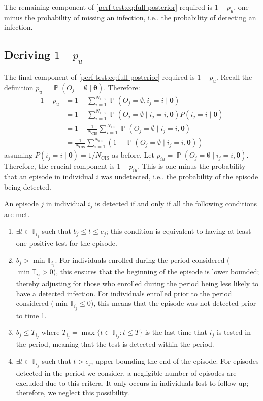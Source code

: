 \documentclass[12pt]{article}
\makeatletter
\DeclareMathOperator{\prob}{\mathbb{P}}
\renewcommand{\vec}[1]{\bm{#1}}
\newcommand{\ssep}{:}
\newcommand{\Ncis}{N_\text{CIS}}
\newcommand{\sched}{\mathbb{T}}
\DeclareRobustCommand\onedot{\futurelet\@let@token\@onedot}
\def\@onedot{\ifx\@let@token.\else.\null\fi\xspace}
\def\ie{i.e\onedot} \def\Ie{{I.e}\onedot}
\makeatother
\begin{document}
The remaining component of \cref{perf-test:eq:full-posterior} required is $1- p_u$, one minus the probability of missing an infection, \ie the probability of detecting an infection.

\subsection{Deriving $1 - p_u$} \label{sec:prob-undetected}

The final component of \cref{perf-test:eq:full-posterior} required is $1 - p_u$.
Recall the definition $p_u = \prob(O_j = \emptyset \mid \vec{\theta})$.
Therefore:
\begin{align}
  1 - p_u
  &= 1 - \sum_{i=1}^{\Ncis} \prob(O_j = \emptyset, i_j = i \mid \vec{\theta}) \\
  &= 1 - \sum_{i=1}^{\Ncis} \prob(O_j = \emptyset \mid i_j = i, \vec{\theta}) P(i_j = i \mid \vec{\theta}) \\
  &= 1 - \frac{1}{\Ncis}\sum_{i=1}^{\Ncis} \prob(O_j = \emptyset \mid i_j = i, \vec{\theta}) \\
  &= \frac{1}{\Ncis} \sum_{i=1}^{\Ncis} (1 - \prob(O_j = \emptyset \mid i_j = i, \vec{\theta}))
  \label{perf-test:eq:pu}
\end{align}
assuming $P(i_j = i \mid \vec{\theta}) = 1/\Ncis$ as before.
Let $p_{iu} = \prob(O_j = \emptyset \mid i_j = i, \vec{\theta})$.
Therefore, the crucial component is $1 - p_{iu}$.
This is one minus the probability that an episode in individual $i$ was undetected, \ie the probability of the episode being detected.

An episode $j$ in individual $i_j$ is detected if and only if all the following conditions are met.
\begin{enumerate}
    \item $\exists t \in \sched_{i_j}$ such that $b_j \leq t \leq e_j$; this condition is equivalent to having at least one positive test for the episode.
    \item $b_j > \min \sched_{i_j}$.
      For individuals enrolled during the period considered ($\min \sched_{i_j} > 0$), this ensures that the beginning of the episode is lower bounded; thereby adjusting for those who enrolled during the period being less likely to have a detected infection.
      For individuals enrolled prior to the period considered ($\min \sched_{i_j} \leq 0$), this means that the episode was not detected prior to time 1.
    \item $b_j \leq T_{i_j}$ where $T_{i_j} = \max \{ t \in \sched_{i_j} \ssep t \leq T \}$ is the last time that $i_j$ is tested in the period, meaning that the test is detected within the period.
    \item $\exists t \in \sched_{i_j}$ such that $t > e_j$, upper bounding the end of the episode.
      For episodes detected in the period we consider, a negligible number of episodes are excluded due to this critera.
      It only occurs in individuals lost to follow-up; therefore, we neglect this possibility.
\end{enumerate}
\end{document}
